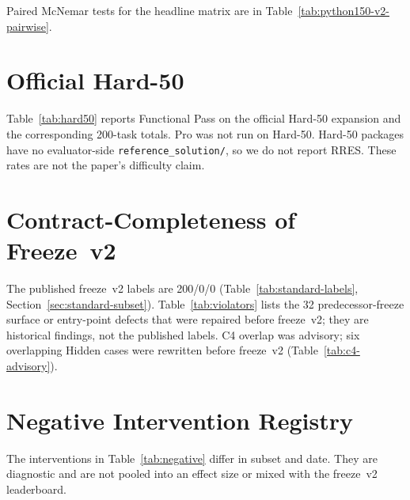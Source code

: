Paired McNemar tests for the headline matrix are in
Table~\ref{tab:python150-v2-pairwise}.

\begin{table}[t]
  \caption{Exact McNemar tests on freeze~v2 Python-150 (discordant tasks).}
  \label{tab:python150-v2-pairwise}
  \centering
  
\end{table}

\section{Official Hard-50}
\label{app:hard50}

Table~\ref{tab:hard50} reports Functional Pass on the official Hard-50
expansion and the corresponding 200-task totals. Pro was not run on Hard-50.
Hard-50 packages have no evaluator-side \texttt{reference\_solution/}, so we
do not report RRES. These rates are not the paper's difficulty claim.

\begin{table}[t]
  \caption{Official Hard-50 Functional Pass on freeze~v2 Official Main,
  with Python-150 and 200-task totals. Pro is 150-only.}
  \label{tab:hard50}
  \centering
  
\end{table}

\section{Contract-Completeness of Freeze~v2}
\label{app:violators}

The published freeze~v2 labels are 200/0/0
(Table~\ref{tab:standard-labels}, Section~\ref{sec:standard-subset}).
Table~\ref{tab:violators} lists the 32 predecessor-freeze surface or
entry-point defects that were repaired before freeze~v2; they are historical
findings, not the published labels. C4 overlap was advisory; six overlapping
Hidden cases were rewritten before freeze~v2
(Table~\ref{tab:c4-advisory}).



\begin{table}[t]
  \caption{C4 test-overlap: predecessor advisory counts versus freeze~v2
  after the six Hidden rewrites.}
  \label{tab:c4-advisory}
  \centering
  
\end{table}

\section{Negative Intervention Registry}
\label{app:negative-registry}

The interventions in Table~\ref{tab:negative} differ in subset and date.
They are diagnostic and are not pooled into an effect size or mixed with
the freeze~v2 leaderboard.
